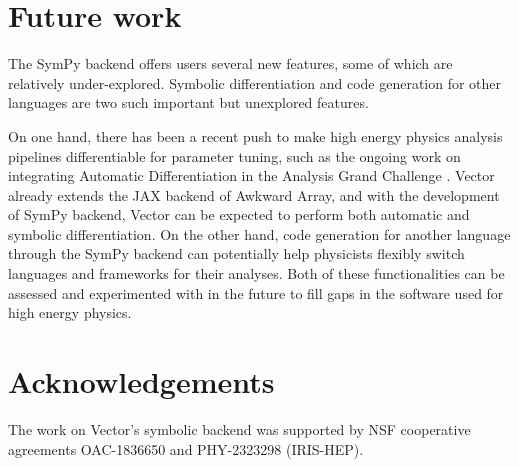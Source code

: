 \documentclass{webofc}
\begin{document}
\section{Future work}
\label{sec-future-work}

The SymPy backend offers users several new features, some of which are relatively under-explored. Symbolic differentiation and code generation for other languages are two such important but unexplored features.

On one hand, there has been a recent push to make high energy physics analysis pipelines differentiable for parameter tuning, such as the ongoing work on integrating Automatic Differentiation in the Analysis Grand Challenge \cite{Held:2022sfw}. Vector already extends the JAX \cite{Bradbury:2018} backend of Awkward Array, and with the development of SymPy backend, Vector can be expected to perform both automatic and symbolic differentiation. On the other hand, code generation for another language through the SymPy backend can potentially help physicists flexibly switch languages and frameworks for their analyses. Both of these functionalities can be assessed and experimented with in the future to fill gaps in the software used for high energy physics.

\section{Acknowledgements}
\label{sec-acknowledgements}

The work on Vector's symbolic backend was supported by NSF cooperative agreements OAC-1836650 and PHY-2323298 (IRIS-HEP).


\end{document}
